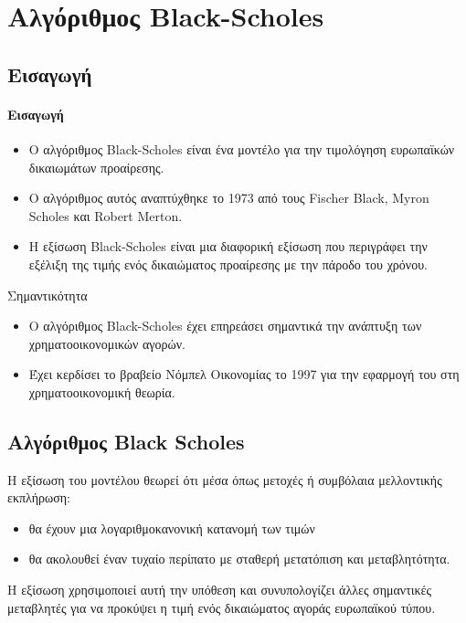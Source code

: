 \chapter{Αλγόριθμος Black-Scholes}
\label{chap:black_scholes}

\section{Εισαγωγή}
\begin{frame}
  \frametitle{Εισαγωγή}
  \begin{itemize}
    \item Ο αλγόριθμος Black-Scholes είναι ένα μοντέλο για την τιμολόγηση ευρωπαϊκών δικαιωμάτων προαίρεσης.
    \item Ο αλγόριθμος αυτός αναπτύχθηκε το 1973 από τους Fischer Black, Myron Scholes και Robert Merton.
    \item Η εξίσωση Black-Scholes είναι μια διαφορική εξίσωση που περιγράφει την εξέλιξη της τιμής ενός δικαιώματος προαίρεσης με την πάροδο του χρόνου.
  \end{itemize}

  \begin{block}{Σημαντικότητα}
    \begin{itemize}
      \item Ο αλγόριθμος Black-Scholes έχει επηρεάσει σημαντικά την ανάπτυξη των χρηματοοικονομικών αγορών.
      \item Έχει κερδίσει το βραβείο Νόμπελ Οικονομίας το 1997 για την εφαρμογή του στη χρηματοοικονομική θεωρία.
    \end{itemize}
  \end{block}
\end{frame}

\section{Αλγόριθμος Black Scholes}

H εξίσωση του μοντέλου θεωρεί ότι μέσα όπως μετοχές ή συμβόλαια μελλοντικής εκπλήρωση:
\begin{itemize}
    \item θα έχουν μια λογαριθμοκανονική κατανομή των τιμών
    \item θα ακολουθεί έναν τυχαίο περίπατο με σταθερή μετατόπιση και μεταβλητότητα.
\end{itemize}

Η εξίσωση χρησιμοποιεί αυτή την υπόθεση και συνυπολογίζει άλλες σημαντικές μεταβλητές για να προκύψει η τιμή ενός δικαιώματος αγοράς ευρωπαϊκού τύπου.

